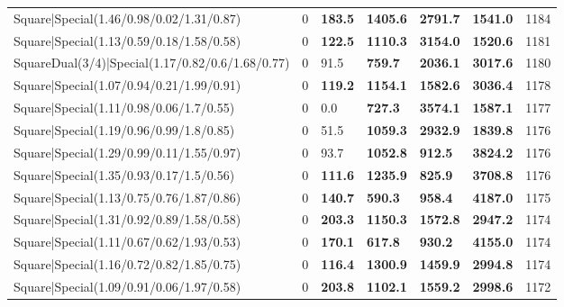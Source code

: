 \begin{tabular}{lrllllr}
 Square|Special(1.46/0.98/0.02/1.31/0.87)                      &             0   & \textbf{183.5} & \textbf{1405.6} & \textbf{2791.7} & \textbf{1541.0} &         1184 \\
 Square|Special(1.13/0.59/0.18/1.58/0.58)                      &             0   & \textbf{122.5} & \textbf{1110.3} & \textbf{3154.0} & \textbf{1520.6} &         1181 \\
 SquareDual(3/4)|Special(1.17/0.82/0.6/1.68/0.77)              &             0   & 91.5           & \textbf{759.7}  & \textbf{2036.1} & \textbf{3017.6} &         1180 \\
 Square|Special(1.07/0.94/0.21/1.99/0.91)                      &             0   & \textbf{119.2} & \textbf{1154.1} & \textbf{1582.6} & \textbf{3036.4} &         1178 \\
 Square|Special(1.11/0.98/0.06/1.7/0.55)                       &             0   & 0.0            & \textbf{727.3}  & \textbf{3574.1} & \textbf{1587.1} &         1177 \\
 Square|Special(1.19/0.96/0.99/1.8/0.85)                       &             0   & 51.5           & \textbf{1059.3} & \textbf{2932.9} & \textbf{1839.8} &         1176 \\
 Square|Special(1.29/0.99/0.11/1.55/0.97)                      &             0   & 93.7           & \textbf{1052.8} & \textbf{912.5}  & \textbf{3824.2} &         1176 \\
 Square|Special(1.35/0.93/0.17/1.5/0.56)                       &             0   & \textbf{111.6} & \textbf{1235.9} & \textbf{825.9}  & \textbf{3708.8} &         1176 \\
 Square|Special(1.13/0.75/0.76/1.87/0.86)                      &             0   & \textbf{140.7} & \textbf{590.3}  & \textbf{958.4}  & \textbf{4187.0} &         1175 \\
 Square|Special(1.31/0.92/0.89/1.58/0.58)                      &             0   & \textbf{203.3} & \textbf{1150.3} & \textbf{1572.8} & \textbf{2947.2} &         1174 \\
 Square|Special(1.11/0.67/0.62/1.93/0.53)                      &             0   & \textbf{170.1} & \textbf{617.8}  & \textbf{930.2}  & \textbf{4155.0} &         1174 \\
 Square|Special(1.16/0.72/0.82/1.85/0.75)                      &             0   & \textbf{116.4} & \textbf{1300.9} & \textbf{1459.9} & \textbf{2994.8} &         1174 \\
 Square|Special(1.09/0.91/0.06/1.97/0.58)                      &             0   & \textbf{203.8} & \textbf{1102.1} & \textbf{1559.2} & \textbf{2998.6} &         1172 \\

\end{tabular}
